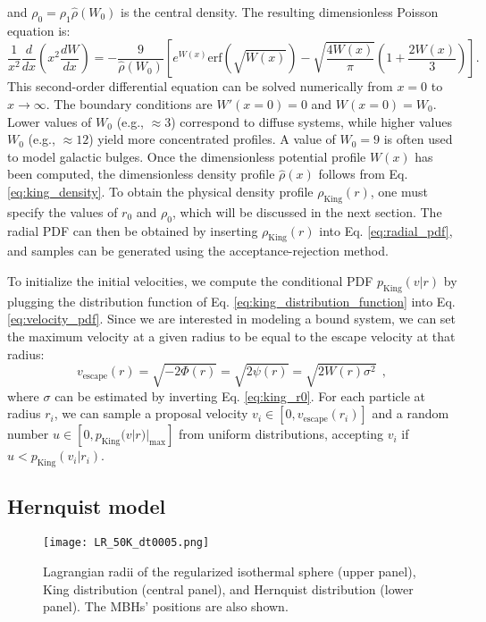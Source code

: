 \documentclass[fleqn,usenatbib]{mnras}
\begin{document}
and $\rho_0 = \rho_1 \hat{\rho}(W_0)$ is the central density.
The resulting dimensionless Poisson equation is:
{\fontsize{6.8pt}{6.8pt}\begin{equation}
    \dfrac{1}{x^2} \dfrac{d}{dx} \left(x^2 \dfrac{dW}{dx}\right) = 
    - \dfrac{9}{\hat{\rho}(W_0)} \left[ e^{W(x)} \text{erf}\left(\sqrt{W(x)}\right) - \sqrt{\dfrac{4 W(x)}{\pi}} \left(1+\dfrac{2 W(x)}{3}\right) \right] .
    \label{eq:king_poisson_dimensionless}
\end{equation}}
This second-order differential equation can be solved numerically from $x=0$ to $x \rightarrow \infty$.
The boundary conditions are $W'(x=0)=0$ and $W(x=0)=W_0$. 
Lower values of $W_0$ (e.g., $\approx 3$) correspond to diffuse systems, while higher values $W_0$ (e.g., $\approx 12$) yield more concentrated profiles. A value of $W_0 = 9$ is often used to model galactic bulges.
Once the dimensionless potential profile $W(x)$ has been computed, the dimensionless density profile $\hat{\rho}(x)$ follows from Eq. \ref{eq:king_density}.
To obtain the physical density profile $\rho_\text{King}(r)$, one must specify the values of $r_0$ and $\rho_0$, which will be discussed in the next section.
The radial PDF can then be obtained by inserting $\rho_\text{King}(r)$ into Eq. \ref{eq:radial_pdf}, and samples can be generated using the acceptance-rejection method.
\vspace{0.5em}

To initialize the initial velocities, we compute the conditional PDF $p_\text{King}(v|r)$  by plugging the distribution function of Eq. \ref{eq:king_distribution_function} into Eq. \ref{eq:velocity_pdf}.
Since we are interested in modeling a bound system, we can set the maximum velocity at a given radius to be equal to the escape velocity at that radius:
\begin{equation}
    v_\text{escape}(r)=\sqrt{-2\Phi(r)}=\sqrt{2\psi(r)}=\sqrt{2W(r) \sigma^2} \:\: ,
    \label{eq:king_escape_velocity}
\end{equation}
where $\sigma$ can be estimated by inverting Eq. \ref{eq:king_r0}.
For each particle at radius $r_i$, we can sample a proposal velocity $v_i \in [0, v_\text{escape}(r_i)]$ and a random number $u \in [0, p_\text{King}(v|r)|_\text{max}]$ from uniform distributions, accepting $v_i$ if $u < p_\text{King}(v_i|r_i)$.

\subsection{Hernquist model}\label{sec:Hernquist_model}
\begin{figure}\centering
	\texttt{[image: LR\_50K\_dt0005.png]}
    \caption{Lagrangian radii of the regularized isothermal sphere (upper panel), King distribution (central panel), and Hernquist distribution (lower panel). The MBHs' positions are also shown.}
    \label{fig:Lagrangian_radii}
\end{figure}
\end{document}
